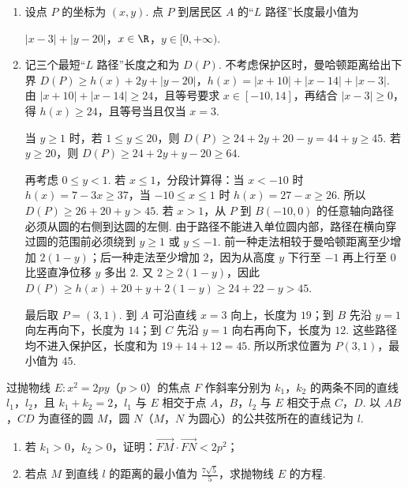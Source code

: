 \begin{solution}
\begin{enumerate}
\item 设点 \(P\) 的坐标为 \((x,y)\). 点 \(P\) 到居民区 \(A\) 的“\(L\) 路径”长度最小值为

\(\lvert x-3\rvert+\lvert y-20\rvert\)，\(x\in\R\)，\(y\in[0,+\infty)\).

\item 记三个最短“\(L\) 路径”长度之和为 \(D(P)\). 不考虑保护区时，曼哈顿距离给出下界
\(D(P)\geqslant h(x)+2y+\lvert y-20\rvert\)，\(h(x)=\lvert x+10\rvert+\lvert x-14\rvert+\lvert x-3\rvert\).
由
\(\lvert x+10\rvert+\lvert x-14\rvert\geqslant24\)，且等号要求 \(x\in[-10,14]\)，再结合 \(\lvert x-3\rvert\geqslant0\)，得 \(h(x)\geqslant24\)，且等号当且仅当 \(x=3\).

当 \(y\geqslant1\) 时，若 \(1\leqslant y\leqslant20\)，则
\(D(P)\geqslant24+2y+20-y=44+y\geqslant45\). 若 \(y\geqslant20\)，则
\(D(P)\geqslant24+2y+y-20\geqslant64\).

再考虑 \(0\leqslant y<1\). 若 \(x\leqslant1\)，分段计算得：当 \(x<-10\) 时 \(h(x)=7-3x\geqslant37\)，当 \(-10\leqslant x\leqslant1\) 时 \(h(x)=27-x\geqslant26\). 所以 \(D(P)\geqslant26+20+y>45\). 若 \(x>1\)，从 \(P\) 到 \(B(-10,0)\) 的任意轴向路径必须从圆的右侧到达圆的左侧. 由于路径不能进入单位圆内部，路径在横向穿过圆的范围前必须绕到 \(y\geqslant1\) 或 \(y\leqslant-1\). 前一种走法相较于曼哈顿距离至少增加 \(2(1-y)\)；后一种走法至少增加 \(2\)，因为从高度 \(y\) 下行至 \(-1\) 再上行至 \(0\) 比竖直净位移 \(y\) 多出 \(2\). 又 \(2\geqslant2(1-y)\)，因此
\(D(P)\geqslant h(x)+20+y+2(1-y)\geqslant24+22-y>45\).

最后取 \(P=(3,1)\). 到 \(A\) 可沿直线 \(x=3\) 向上，长度为 \(19\)；到 \(B\) 先沿 \(y=1\) 向左再向下，长度为 \(14\)；到 \(C\) 先沿 \(y=1\) 向右再向下，长度为 \(12\). 这些路径均不进入保护区，长度和为 \(19+14+12=45\). 所以所求位置为 \(P(3,1)\)，最小值为 \(45\).
\end{enumerate}
\end{solution}

\begin{problem}
过抛物线 \(E: x^{2} = 2py\)（\(p > 0\)）的焦点 \(F\) 作斜率分别为 \(k_{1}\)，\(k_{2}\) 的两条不同的直线 \(l_{1}\)，\(l_{2}\)，且 \(k_{1} + k_{2} = 2\)，\(l_{1}\) 与 \(E\) 相交于点 \(A\)，\(B\)，\(l_{2}\) 与 \(E\) 相交于点 \(C\)，\(D\). 以 \(AB\)，\(CD\) 为直径的圆 \(M\)，圆 \(N\)（\(M\)，\(N\) 为圆心）的公共弦所在的直线记为 \(l\).
\begin{enumerate}
\item 若 \(k_{1} > 0\)，\(k_{2} > 0\)，证明：\(\overrightarrow{FM} \cdot \overrightarrow{FN} < 2p^{2}\)；
\item 若点 \(M\) 到直线 \(l\) 的距离的最小值为 \(\frac{7\sqrt{5}}{5}\)，求抛物线 \(E\) 的方程.
\end{enumerate}
\end{problem}

